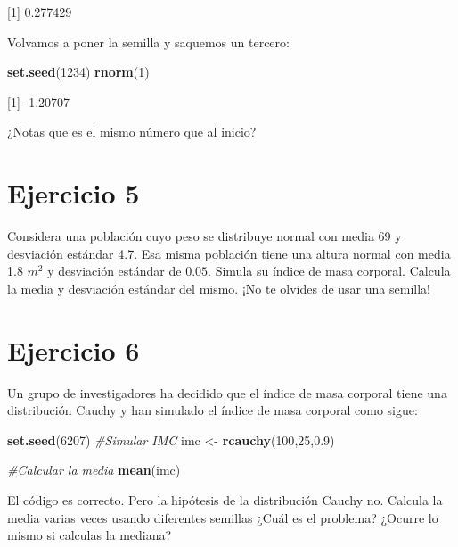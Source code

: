 \documentclass[
]{book}
\newenvironment{Shaded}{\begin{snugshade}}{\end{snugshade}}
\newcommand{\CommentTok}[1]{\textcolor[rgb]{0.56,0.35,0.01}{\textit{#1}}}
\newcommand{\DecValTok}[1]{\textcolor[rgb]{0.00,0.00,0.81}{#1}}
\newcommand{\FloatTok}[1]{\textcolor[rgb]{0.00,0.00,0.81}{#1}}
\newcommand{\KeywordTok}[1]{\textcolor[rgb]{0.13,0.29,0.53}{\textbf{#1}}}
\newcommand{\NormalTok}[1]{#1}
\newcommand{\StringTok}[1]{\textcolor[rgb]{0.31,0.60,0.02}{#1}}
\begin{document}
{[}1{]} 0.277429

Volvamos a poner la semilla y saquemos un tercero:

\begin{Shaded}
\begin{Highlighting}[]
\KeywordTok{set.seed}\NormalTok{(}\DecValTok{1234}\NormalTok{)}
\KeywordTok{rnorm}\NormalTok{(}\DecValTok{1}\NormalTok{)}
\end{Highlighting}
\end{Shaded}

{[}1{]} -1.20707

¿Notas que es el mismo número que al inicio?

\hypertarget{ejercicio-5}{%
\section{Ejercicio 5}\label{ejercicio-5}}

Considera una población cuyo peso se distribuye normal con media 69 y desviación estándar 4.7. Esa misma población tiene una altura normal con media 1.8 \(m^2\) y desviación estándar de \(0.05\). Simula su índice de masa corporal. Calcula la media y desviación estándar del mismo. ¡No te olvides de usar una semilla!

\hypertarget{ejercicio-6}{%
\section{Ejercicio 6}\label{ejercicio-6}}

Un grupo de investigadores ha decidido que el índice de masa corporal tiene una distribución Cauchy y han simulado el índice de masa corporal como sigue:

\begin{Shaded}
\begin{Highlighting}[]
\KeywordTok{set.seed}\NormalTok{(}\DecValTok{6207}\NormalTok{)}
\CommentTok{#Simular IMC}
\NormalTok{imc <-}\StringTok{ }\KeywordTok{rcauchy}\NormalTok{(}\DecValTok{100}\NormalTok{,}\DecValTok{25}\NormalTok{,}\FloatTok{0.9}\NormalTok{)}

\CommentTok{#Calcular la media}
\KeywordTok{mean}\NormalTok{(imc)}
\end{Highlighting}
\end{Shaded}

El código es correcto. Pero la hipótesis de la distribución Cauchy no. Calcula la media varias veces usando diferentes semillas ¿Cuál es el problema? ¿Ocurre lo mismo si calculas la mediana?

  
\end{document}
